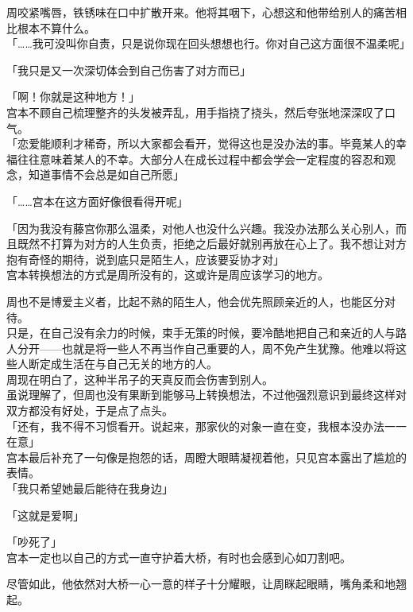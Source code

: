 周咬紧嘴唇，铁锈味在口中扩散开来。他将其咽下，心想这和他带给别人的痛苦相比根本不算什么。\\

「……我可没叫你自责，只是说你现在回头想想也行。你对自己这方面很不温柔呢」

「我只是又一次深切体会到自己伤害了对方而已」

「啊！你就是这种地方！」\\

宫本不顾自己梳理整齐的头发被弄乱，用手指挠了挠头，然后夸张地深深叹了口气。\\

「恋爱能顺利才稀奇，所以大家都会看开，觉得这也是没办法的事。毕竟某人的幸福往往意味着某人的不幸。大部分人在成长过程中都会学会一定程度的容忍和观念，知道事情不会总是如自己所愿」

「……宫本在这方面好像很看得开呢」

「因为我没有藤宫你那么温柔，对他人也没什么兴趣。我没办法那么关心别人，而且既然不打算为对方的人生负责，拒绝之后最好就别再放在心上了。我不想让对方抱有奇怪的期待，说到底只是陌生人，应该要妥协才对」\\

宫本转换想法的方式是周所没有的，这或许是周应该学习的地方。

周也不是博爱主义者，比起不熟的陌生人，他会优先照顾亲近的人，也能区分对待。\\

只是，在自己没有余力的时候，束手无策的时候，要冷酷地把自己和亲近的人与路人分开——也就是将一些人不再当作自己重要的人，周不免产生犹豫。他难以将这些人断定成生活在与自己无关的地方的人。\\

周现在明白了，这种半吊子的天真反而会伤害到别人。\\

虽说理解了，但周也没有果断到能够马上转换想法，不过他强烈意识到最终这样对双方都没有好处，于是点了点头。\\

「还有，我不得不习惯看开。说起来，那家伙的对象一直在变，我根本没办法一一在意」\\

宫本最后补充了一句像是抱怨的话，周瞪大眼睛凝视着他，只见宫本露出了尴尬的表情。\\

「我只希望她最后能待在我身边」

「这就是爱啊」

「吵死了」\\

宫本一定也以自己的方式一直守护着大桥，有时也会感到心如刀割吧。

尽管如此，他依然对大桥一心一意的样子十分耀眼，让周眯起眼睛，嘴角柔和地翘起。

